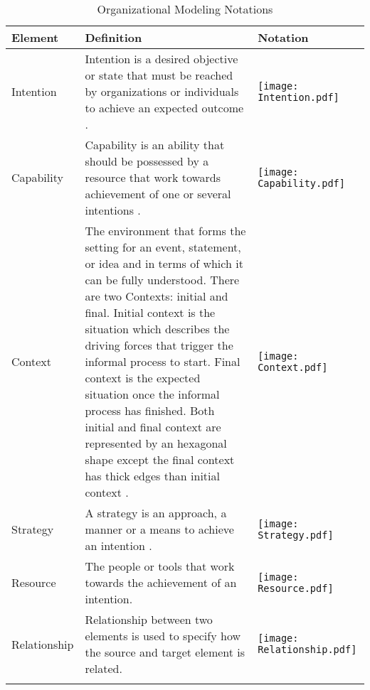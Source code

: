 \begin{center}
	\begin{longtable}{p{3cm}p{10cm}p{3cm}}
		\toprule 
		\textbf{Element} & \textbf{Definition} & \textbf{Notation} \\
		\midrule
		\endfirsthead
		Intention 			& Intention is a desired objective or state that must be reached by organizations or individuals to achieve an expected outcome \cite{DelaVaraGonzalez2007}. & \begin{center} \texttt{[image: Intention.pdf]}  \end{center}  \\
		
		Capability	&  Capability is an ability that should be possessed by a resource that work towards achievement of one or several intentions \cite{Sierr2015}.   & \begin{center} \texttt{[image: Capability.pdf]} \end{center}  \\
		
		Context				& The environment that forms the setting for an event, statement, or idea and in terms of which it can be fully understood. There are two Contexts: initial and final. Initial context is the situation which describes the driving forces that trigger the informal process to start. Final context is the expected situation once the informal process has finished. Both initial and final context are represented by an hexagonal shape except the final context has thick edges than initial context \cite{Sierr2015}.  & \begin{center} \texttt{[image: Context.pdf]} \end{center}   \\
		\newline
		Strategy		& \newline  A strategy is an approach, a manner or a means to achieve an intention \cite{Bider2005}.   & \begin{center} \texttt{[image: Strategy.pdf]} \end{center}  \\
		
		Resource					& The people or tools that work towards the achievement of an intention. & \begin{center} \texttt{[image: Resource.pdf]} \end{center}  \\
		
		Relationship				& Relationship between two elements is used to specify how the source and target element is related.  & \begin{center} \texttt{[image: Relationship.pdf]} \end{center}   \\
		
		\bottomrule
		\caption{Organizational Modeling Notations}
		\label{tab:notations}		
	\end{longtable}	
\end{center}

